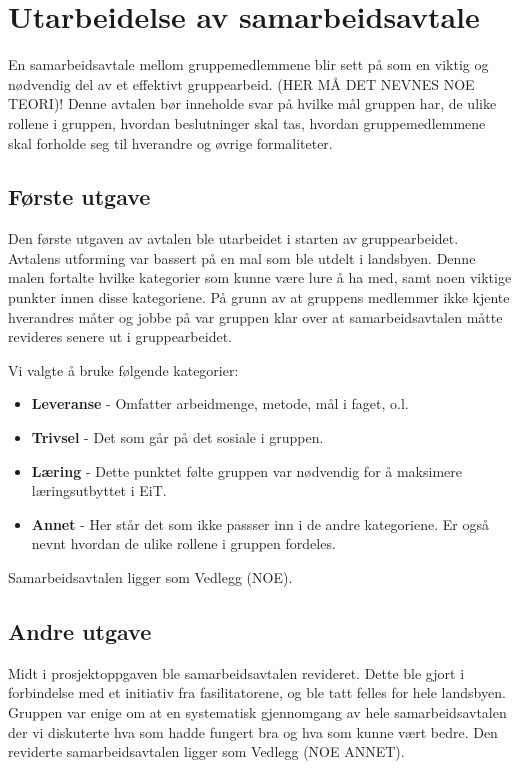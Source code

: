 \section{Utarbeidelse av samarbeidsavtale}
En samarbeidsavtale mellom gruppemedlemmene blir sett på som en viktig og nødvendig del av et effektivt gruppearbeid. 
(HER MÅ DET NEVNES NOE TEORI)!
Denne avtalen bør inneholde svar på hvilke mål gruppen har, de ulike rollene i gruppen, hvordan beslutninger skal tas, hvordan gruppemedlemmene skal forholde seg til hverandre og øvrige formaliteter. 

\subsection{Første utgave}
Den første utgaven av avtalen ble utarbeidet i starten av gruppearbeidet. 
Avtalens utforming var bassert på en mal som ble utdelt i landsbyen. 
Denne malen fortalte hvilke kategorier som kunne være lure å ha med, samt noen viktige punkter innen disse kategoriene. 
På grunn av at gruppens medlemmer ikke kjente hverandres måter og jobbe på var gruppen klar over at samarbeidsavtalen måtte revideres senere ut i gruppearbeidet. 
\vspace{\secspace}

Vi valgte å bruke følgende kategorier:
\begin{itemize}
    \item \textbf{Leveranse} - Omfatter arbeidmenge, metode, mål i faget, o.l.
    \item \textbf{Trivsel} - Det som går på det sosiale i gruppen. 
    \item \textbf{Læring} - Dette punktet følte gruppen var nødvendig for å maksimere læringsutbyttet i EiT. 
    \item \textbf{Annet} - Her står det som ikke passser inn i de andre kategoriene. Er også nevnt hvordan de ulike rollene i gruppen fordeles. 
\end{itemize}
Samarbeidsavtalen ligger som Vedlegg (NOE). 

\subsection{Andre utgave}
Midt i prosjektoppgaven ble samarbeidsavtalen revideret. 
Dette ble gjort i forbindelse med et initiativ fra fasilitatorene, og ble tatt felles for hele landsbyen. 
Gruppen var enige om at en systematisk gjennomgang av hele samarbeidsavtalen der vi diskuterte hva som hadde fungert bra og hva som kunne vært bedre. 
\vspace{\secspace}
Den reviderte samarbeidsavtalen ligger som Vedlegg (NOE ANNET).  


